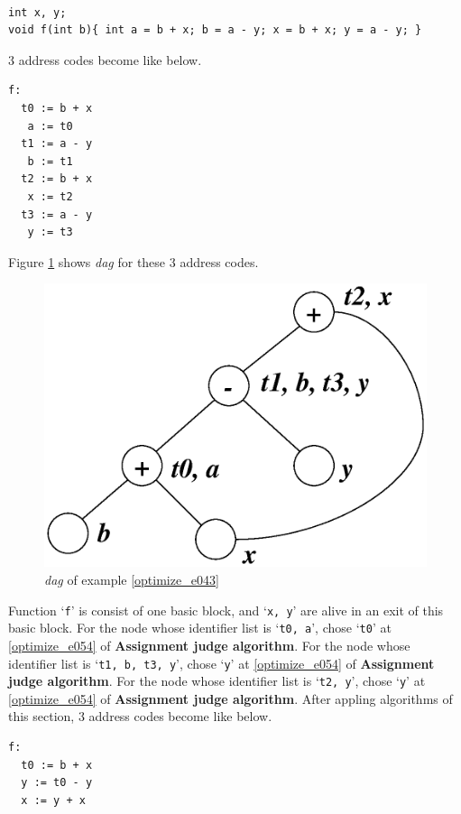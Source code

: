 \begin{Example}
\label{optimize_e043}
\begin{verbatim}

int x, y;
void f(int b){ int a = b + x; b = a - y; x = b + x; y = a - y; }
\end{verbatim}
3 address codes become like below.
\begin{verbatim}
f:
  t0 := b + x
   a := t0
  t1 := a - y
   b := t1
  t2 := b + x
   x := t2
  t3 := a - y
   y := t3
\end{verbatim}
Figure \ref{optimize_e044} shows {\em dag} for these 3 address codes.
\begin{figure}[htbp]
\begin{center}
\includegraphics[width=0.7\linewidth,height=0.540\linewidth]{opt023.eps}
\caption{{\em dag} of example \ref{optimize_e043}}
\label{optimize_e044}
\end{center}
\end{figure}
Function `{\tt{f}}' is consist of one basic block, and 
`{\tt{x, y}}' are alive in an exit of this basic block.
For the node whose identifier list is `{\tt{t0, a}}',
chose `{\tt{t0}}' at \ref{optimize_e054} of {\bf Assignment judge algorithm}.
For the node whose identifier list is `{\tt{t1, b, t3, y}}',
chose `{\tt{y}}' at \ref{optimize_e054} of {\bf Assignment judge algorithm}.
For the node whose identifier list is `{\tt{t2, y}}',
chose `{\tt{y}}' at \ref{optimize_e054} of {\bf Assignment judge algorithm}.
After appling algorithms of this section,
3 address codes become like below.
\begin{verbatim}
f:
  t0 := b + x
  y := t0 - y
  x := y + x
\end{verbatim}
\end{Example}

